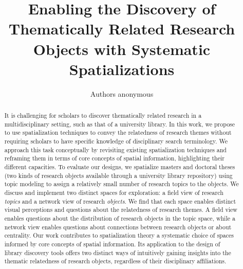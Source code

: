 \documentclass[a4paper,UKenglish]{lipics-v2018}
\title{Enabling the Discovery of Thematically Related Research Objects with Systematic Spatializations}
\author{Authors anonymous}{Affiliations anonymous}{}{}{}
\begin{document}
\maketitle

\begin{abstract}
It is challenging for scholars to discover thematically related research in a multidisciplinary setting, such as that of a university library. In this work, we propose to use spatialization techniques to convey the relatedness of research themes without requiring scholars to have specific knowledge of disciplinary search terminology. We approach this task conceptually by revisiting existing spatialization techniques and reframing them in terms of core concepts of spatial information, highlighting their different capacities. To evaluate our designs, we spatialize masters and doctoral theses (two kinds of research objects available through a university library repository) using topic modeling to assign a relatively small number of research topics to the objects. We discuss and implement two distinct spaces for exploration: a field view of research \textit{topics} and a network view of research \textit{objects}. We find that each space enables distinct visual perceptions and questions about the relatedness of research themes. A field view enables questions about the distribution of research objects in the topic space, while a network view enables questions about connections between research objects or about centrality. Our work contributes to spatialization theory a systematic choice of spaces informed by core concepts of spatial information. Its application to the design of library discovery tools offers two distinct ways of intuitively gaining insights into the thematic relatedness of research objects, regardless of their disciplinary affiliations. 
 \end{abstract}
\end{document}
